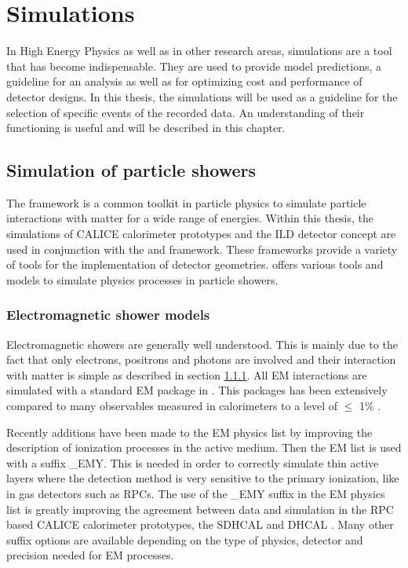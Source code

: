 \chapter{\geant Simulations}
\label{chap:G4Simulation}

In High Energy Physics as well as in other research areas, simulations are a tool that has become indispensable. They are used to provide model predictions, a guideline for an analysis as well as for optimizing cost and performance of detector designs. In this thesis, the simulations will be used as a guideline for the selection of specific events of the recorded data. An understanding of their functioning is useful and will be described in this chapter.

\section{Simulation of particle showers}

The \geant framework \cite{Agostinelli2003} is a common toolkit in particle physics to simulate particle interactions with matter for a wide range of energies. Within this thesis, the simulations of CALICE calorimeter prototypes and the ILD detector concept are used in conjunction with the \mokka \cite{Freitas2003} and \ddhep \cite{Frank2014} framework. These frameworks provide a variety of tools for the implementation of detector geometries. \geant offers various tools and models to simulate physics processes in particle showers.

\subsection{Electromagnetic shower models}

Electromagnetic showers are generally well understood. This is mainly due to the fact that only electrons, positrons and photons are involved and their interaction with matter is simple as described in section \ref{}. All EM interactions are simulated with a standard EM package in \geant \cite{Ivanchenko2010}. This packages has been extensively compared to many observables measured in calorimeters to a level of $\leq$ 1\% \cite{Apostolakis2015}.

Recently additions have been made to the \geant EM physics list by improving the description of ionization processes in the active medium. Then the EM list is used with a suffix \_{}EMY. This is needed in order to correctly simulate thin active layers where the detection method is very sensitive to the primary ionization, like in gas detectors such as RPCs. The use of the \_{}EMY suffix in the EM physics list is greatly improving the agreement between data and simulation in the RPC based CALICE calorimeter prototypes, the SDHCAL and DHCAL \cite{Neubueser2016}. Many other suffix options are available depending on the type of physics, detector and precision needed for EM processes.

